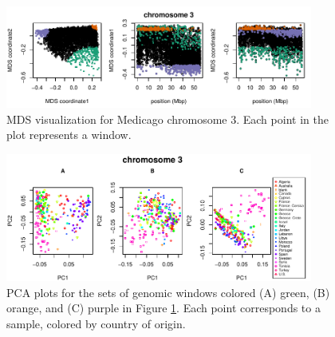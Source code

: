 \documentclass[11pt, oneside]{article}   	%
\begin{document}
\begin{figure}
    \begin{center}
       \includegraphics[width=0.9\textwidth]{Fig6_Together_MDS_plot_chr3_final}
    \end{center}
    \caption{
     MDS visualization for Medicago chromosome 3. Each point in the plot represents a window.
       \label{fig:mds12_medicago}
    }
\end{figure}

\begin{figure}
    \begin{center}
       \includegraphics[width=0.9\textwidth]{Fig7_pca_plots_for_Medicago_chr3_3peaks_byMDS}
    \end{center}
    \caption{
        PCA plots for the sets of genomic windows colored (A) green, (B) orange, and (C) purple in Figure \ref{fig:mds12_medicago}. 
        Each point corresponds to a sample, colored by country of origin.
        \label{fig:pca_medicago}
    }
\end{figure}
\end{document}
